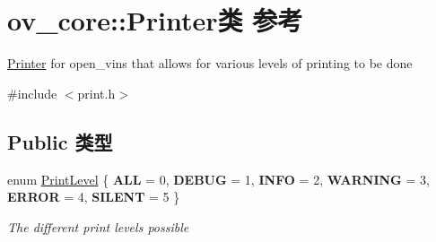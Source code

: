\hypertarget{classov__core_1_1Printer}{}\section{ov\+\_\+core\+:\+:Printer类 参考}
\label{classov__core_1_1Printer}


\hyperlink{classov__core_1_1Printer}{Printer} for open\+\_\+vins that allows for various levels of printing to be done  




{\ttfamily \#include $<$print.\+h$>$}

\subsection*{Public 类型}
\begin{DoxyCompactItemize}
\item 
enum \hyperlink{classov__core_1_1Printer_a1c4c6c612ec6251afd91a1ddf933a0b2}{Print\+Level} \{ \newline
{\bfseries A\+LL} = 0, 
{\bfseries D\+E\+B\+UG} = 1, 
{\bfseries I\+N\+FO} = 2, 
{\bfseries W\+A\+R\+N\+I\+NG} = 3, 
\newline
{\bfseries E\+R\+R\+OR} = 4, 
{\bfseries S\+I\+L\+E\+NT} = 5
 \}\begin{DoxyCompactList}\small\item\em The different print levels possible \end{DoxyCompactList}
\end{DoxyCompactItemize}
